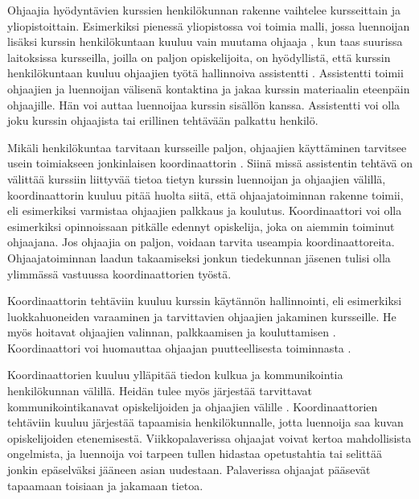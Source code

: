 \documentclass[finnish]{tktltiki2}
\theoremstyle{definition}
\theoremstyle{remark}
\begin{document}
Ohjaajia hyödyntävien kurssien henkilökunnan rakenne vaihtelee kursseittain ja yliopistoittain. Esimerkiksi pienessä yliopistossa voi toimia malli, jossa luennoijan lisäksi kurssin henkilökuntaan kuuluu vain muutama ohjaaja \cite{Dickson11}, kun taas suurissa laitoksissa kursseilla, joilla on paljon opiskelijoita, on hyödyllistä, että kurssin henkilökuntaan kuuluu ohjaajien työtä hallinnoiva assistentti \cite{Reges03}. Assistentti toimii ohjaajien ja luennoijan välisenä kontaktina ja jakaa kurssin materiaalin eteenpäin ohjaajille. Hän voi auttaa luennoijaa kurssin sisällön kanssa. Assistentti voi olla joku kurssin ohjaajista tai erillinen tehtävään palkattu henkilö. \par

Mikäli henkilökuntaa tarvitaan kursseille paljon, ohjaajien käyttäminen tarvitsee usein toimiakseen jonkinlaisen koordinaattorin \cite{Roberts95}. Siinä missä assistentin tehtävä on välittää kurssiin liittyvää tietoa tietyn kurssin luennoijan ja ohjaajien välillä, koordinaattorin kuuluu pitää huolta siitä, että ohjaajatoiminnan rakenne toimii, eli esimerkiksi varmistaa ohjaajien palkkaus ja koulutus. Koordinaattori voi olla esimerkiksi opinnoissaan pitkälle edennyt opiskelija, joka on aiemmin toiminut ohjaajana. Jos ohjaajia on paljon, voidaan tarvita useampia koordinaattoreita. Ohjaajatoiminnan laadun takaamiseksi jonkun tiedekunnan jäsenen tulisi olla ylimmässä vastuussa koordinaattorien työstä. \par

Koordinaattorin tehtäviin kuuluu kurssin käytännön hallinnointi, eli esimerkiksi luokkahuoneiden varaaminen ja tarvittavien ohjaajien jakaminen kursseille. He myös hoitavat ohjaajien valinnan, palkkaamisen ja kouluttamisen \cite{Reges88,Roberts95}. Koordinaattori voi huomauttaa ohjaajan puutteellisesta toiminnasta \cite{Reges88}. \par

Koordinaattorien kuuluu ylläpitää tiedon kulkua ja kommunikointia henkilökunnan välillä. Heidän tulee myös järjestää tarvittavat kommunikointikanavat opiskelijoiden ja ohjaajien välille \cite{Reges88}. Koordinaattorien tehtäviin kuuluu järjestää tapaamisia henkilökunnalle, jotta luennoija saa kuvan opiskelijoiden etenemisestä. Viikkopalaverissa ohjaajat voivat kertoa mahdollisista ongelmista, ja luennoija voi tarpeen tullen hidastaa opetustahtia tai selittää jonkin epäselväksi jääneen asian uudestaan. Palaverissa ohjaajat pääsevät tapaamaan toisiaan ja jakamaan tietoa. \par
\end{document}
